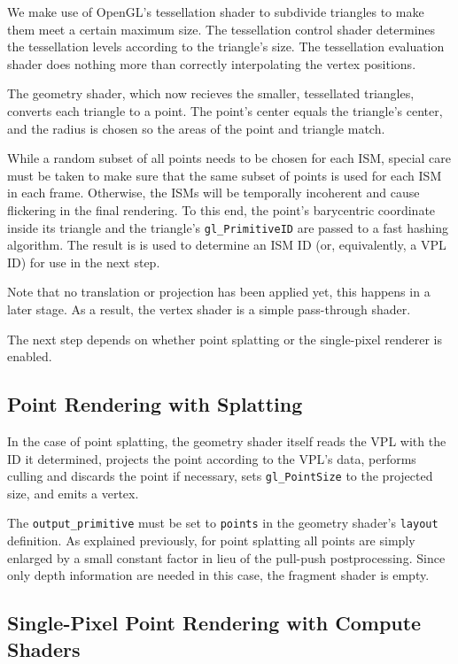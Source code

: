  We make use of OpenGL's tessellation shader to subdivide triangles to make them meet a certain maximum size. The tessellation control shader determines the tessellation levels according to the triangle's size. The tessellation evaluation shader does nothing more than correctly interpolating the vertex positions.

 The geometry shader, which now recieves the smaller, tessellated triangles, converts each triangle to a point. The point's center equals the triangle's center, and the radius is chosen so the areas of the point and triangle match.

 While a random subset of all points needs to be chosen for each ISM, special care must be taken to make sure that the same subset of points is used for each ISM in each frame. Otherwise, the ISMs will be temporally incoherent and cause flickering in the final rendering. To this end, the point's barycentric coordinate inside its triangle and the triangle's \texttt{gl\_PrimitiveID} are passed to a fast hashing algorithm. The result is is used to determine an ISM ID (or, equivalently, a VPL ID) for use in the next step.

 Note that no translation or projection has been applied yet, this happens in a later stage. As a result, the vertex shader is a simple pass-through shader.

 The next step depends on whether point splatting or the single-pixel renderer is enabled.



 \subsection{Point Rendering with Splatting}
 \label{sec:impl:splatting}

 In the case of point splatting, the geometry shader itself reads the VPL with the ID it determined, projects the point according to the VPL's data, performs culling and discards the point if necessary, sets \texttt{gl\_PointSize} to the projected size, and emits a vertex.

 The \texttt{output\_primitive} must be set to \texttt{points} in the geometry shader's \texttt{layout} definition. As explained previously, for point splatting all points are simply enlarged by a small constant factor in lieu of the pull-push postprocessing. Since only depth information are needed in this case, the fragment shader is empty.



 \subsection{Single-Pixel Point Rendering with Compute Shaders}
 \label{sec:impl:singlePixelRendering}

